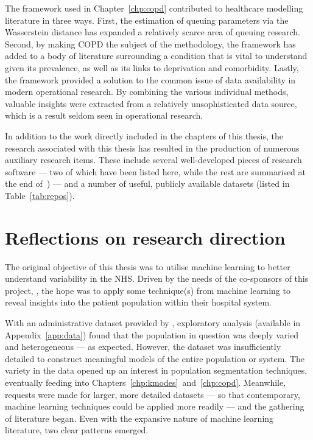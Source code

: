 The framework used in Chapter~\ref{chp:copd} contributed to healthcare modelling
literature in three ways. First, the estimation of queuing parameters via the
Wasserstein distance has expanded a relatively scarce area of queuing research.
Second, by making COPD the subject of the methodology, the framework has added
to a body of literature surrounding a condition that is vital to understand
given its prevalence, as well as its links to deprivation and comorbidity.
Lastly, the framework provided a solution to the common issue of data
availability in modern operational research. By combining the various individual
methods, valuable insights were extracted from a relatively unsophisticated data
source, which is a result seldom seen in operational research.

In addition to the work directly included in the chapters of this thesis, the
research associated with this thesis has resulted in the production of numerous
auxiliary research items. These include several well-developed pieces of
research software --- two of which have been listed here, while the rest are
summarised at the end of~) --- and a number of useful,
publicly available datasets (listed in Table~\ref{tab:repos}).


\section{Reflections on research direction}\label{sec:reflections}

The original objective of this thesis was to utilise machine learning to better
understand variability in the NHS. Driven by the needs of the co-sponsors of
this project, \ctmuhb, the hope was to apply some technique(s) from machine
learning to reveal insights into the patient population within their hospital
system.

With an administrative dataset provided by \ctmuhb, exploratory analysis
(available in Appendix~\ref{app:data}) found that the population in question was
deeply varied and heterogeneous --- as expected. However, the dataset was
insufficiently detailed to construct meaningful models of the entire population
or system. The variety in the data opened up an interest in population
segmentation techniques, eventually feeding into
Chapters~\ref{chp:kmodes}~and~\ref{chp:copd}. Meanwhile, requests were made for
larger, more detailed datasets --- so that contemporary, machine learning
techniques could be applied more readily --- and the gathering of literature
began. Even with the expansive nature of machine learning literature, two clear
patterns emerged.

